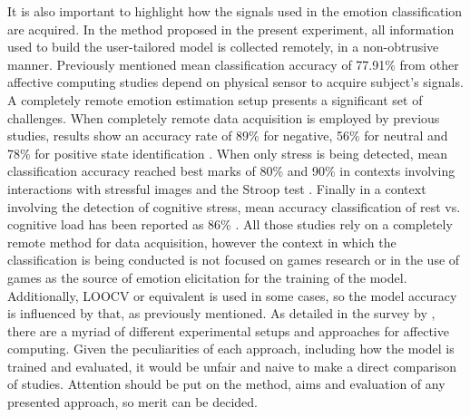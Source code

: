 It is also important to highlight how the signals used in the emotion classification are acquired. In the method proposed in the present experiment, all information used to build the user-tailored model is collected remotely, in a non-obtrusive manner. Previously mentioned mean classification accuracy of 77.91\% from other affective computing studies depend on physical sensor to acquire subject's signals. A completely remote emotion estimation setup presents a significant set of challenges. When completely remote data acquisition is employed by previous studies, results show an accuracy rate of 89\% for negative, 56\% for neutral and 78\% for positive state identification \parencite{mental}. When only stress is being detected, mean classification accuracy reached best marks of 80\% and 90\% in contexts involving interactions with stressful images and the Stroop test \parencite{giannakakis2017stress}. Finally in a context involving the detection of cognitive stress, mean accuracy classification of rest vs. cognitive load has been reported as 86\% \parencite{mcduffcogcam}. All those studies rely on a completely remote method for data acquisition, however the context in which the classification is being conducted is not focused on games research or in the use of games as the source of emotion elicitation for the training of the model. Additionally, LOOCV or equivalent is used in some cases, so the model accuracy is influenced by that, as previously mentioned. As detailed in the survey by \textcite{moghimi2017affective}, there are a myriad of different experimental setups and approaches for affective computing. Given the peculiarities of each approach, including how the model is trained and evaluated, it would be unfair and naive to make a direct comparison of studies. Attention should be put on the method, aims and evaluation of any presented approach, so merit can be decided.

